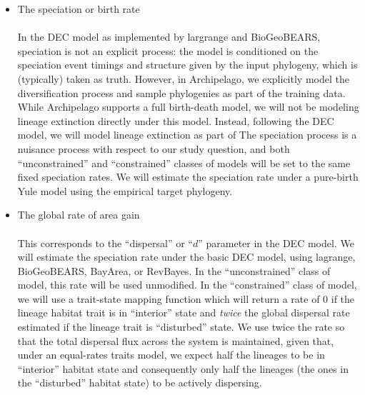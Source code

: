 \documentclass[11pt,openany]{memoir} %
\begin{document}
\begin{itemize}
    \item The speciation or birth rate \hfill \\
        \\
        In the DEC model as implemented by largrange and BioGeoBEARS, speciation is not an explicit process: the model is conditioned on the speciation event timings and structure given by the input phylogeny, which is (typically) taken as truth.
        However, in Archipelago, we explicitly model the diversification process and sample phylogenies as part of the training data.
        While Archipelago supports a full birth-death model, we will not be modeling lineage extinction directly under this model.
        Instead, following the DEC model, we will model lineage extinction as part of
        The speciation process is a nuisance process with respect to our study question, and both ``unconstrained'' and ``constrained'' classes of models will be set to the same fixed speciation rates.
        We will estimate the speciation rate under a pure-birth Yule model using the empirical target phylogeny.
    \item The global rate of area gain \hfill \\
        \\
        This corresponds to the ``dispersal'' or ``$d$'' parameter in the DEC model.
        We will estimate the speciation rate under the basic DEC model, using lagrange, BioGeoBEARS, BayArea, or RevBayes.
        In the ``unconstrained'' class of model, this rate will be used unmodified.
        In the ``constrained'' class of model, we will use a trait-state mapping function which will return a rate of $0$ if the lineage habitat trait is in ``interior'' state and \textit{twice} the global dispersal rate estimated if the lineage trait is ``disturbed'' state.
        We use twice the rate so that the total dispersal flux across the system is maintained, given that, under an equal-rates traits model, we expect half the lineages to be in ``interior'' habitat state and consequently only half the lineages (the ones in the ``disturbed'' habitat state) to be actively dispersing.
\end{itemize}
\end{document}
